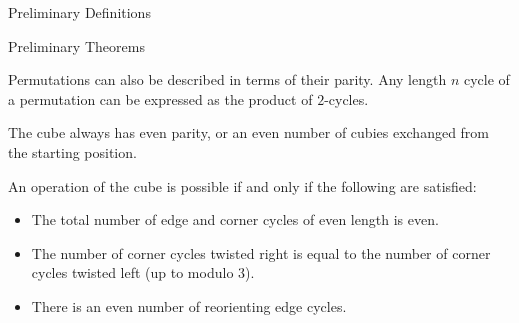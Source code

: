 \documentclass[final]{beamer}
\newlength{\colwidth}
\begin{document}
\begin{frame}[t]
\begin{columns}[t]
\begin{column}{\colwidth}
\begin{alertblock}{Preliminary Definitions}

  \end{alertblock}
 
  \begin{block}{Preliminary Theorems}

     Permutations can also be described in terms of their parity. Any length $n$
cycle of a permutation can be expressed as the product of $2$-cycles.

The cube always has even parity, or an even number of cubies
exchanged from the starting position.

      An operation of the cube is possible if and only if the following are satisfied:
            \begin{itemize}
              \item The total number of edge and corner cycles of even length is even.
              \item The number of corner cycles twisted right is equal to the number of corner cycles twisted left (up to modulo $3$).
              \item There is an even number of reorienting edge cycles.








    \end{itemize}

  \end{block}
  



\end{column}
\end{columns}
\end{frame}
\end{document}
